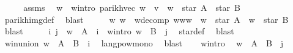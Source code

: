 \begin{isabellebody}
%
\isadelimproof
%
\endisadelimproof
%
\isatagproof
{}\isamarkupfalse%
\ {\isacharminus}{\kern0pt}\isanewline
\ \ \isamarkupfalse%
\ assms\ \isamarkupfalse%
\ w\ \ w{\isacharunderscore}{\kern0pt}intro{\isacharcolon}{\kern0pt}\ {\isachardoublequoteopen}parikh{\isacharunderscore}{\kern0pt}vec\ w\ {\isacharequal}{\kern0pt}\ v\ {\isasymand}\ w\ {\isasymin}\ star\ A\ {\isacharat}{\kern0pt}{\isacharat}{\kern0pt}\ star\ B{\isachardoublequoteclose}\isanewline
\ \ \ \ \isamarkupfalse%
\ parikh{\isacharunderscore}{\kern0pt}img{\isacharunderscore}{\kern0pt}def\ \isamarkupfalse%
\ blast\isanewline
\ \ \isamarkupfalse%
\ \isamarkupfalse%
\ w{}\ w{}\ \ w{\isacharunderscore}{\kern0pt}decomp{\isacharcolon}{\kern0pt}\ {\isachardoublequoteopen}w{\isacharequal}{\kern0pt}w{}{\isacharat}{\kern0pt}w{}\ {\isasymand}\ w{}\ {\isasymin}\ star\ A\ {\isasymand}\ w{}\ {\isasymin}\ star\ B{\isachardoublequoteclose}\ \isamarkupfalse%
\ blast\isanewline
\ \ \isamarkupfalse%
\ \isamarkupfalse%
\ i\ j\ \ {\isachardoublequoteopen}w{}\ {\isasymin}\ A\ {\isacharcircum}{\kern0pt}{\isacharcircum}{\kern0pt}\ i{\isachardoublequoteclose}\ \ w{}{\isacharunderscore}{\kern0pt}intro{\isacharcolon}{\kern0pt}\ {\isachardoublequoteopen}w{}\ {\isasymin}\ B\ {\isacharcircum}{\kern0pt}{\isacharcircum}{\kern0pt}\ j{\isachardoublequoteclose}\ \isamarkupfalse%
\ star{\isacharunderscore}{\kern0pt}def\ \isamarkupfalse%
\ blast\isanewline
\ \ \isamarkupfalse%
\ \isamarkupfalse%
\ w{}{\isacharunderscore}{\kern0pt}in{\isacharunderscore}{\kern0pt}union{\isacharcolon}{\kern0pt}\ {\isachardoublequoteopen}w{}\ {\isasymin}\ {\isacharparenleft}{\kern0pt}A\ {\isasymunion}\ B{\isacharparenright}{\kern0pt}\ {\isacharcircum}{\kern0pt}{\isacharcircum}{\kern0pt}\ i{\isachardoublequoteclose}\ \isamarkupfalse%
\ langpow{\isacharunderscore}{\kern0pt}mono\ \isamarkupfalse%
\ blast\isanewline
\ \ \isamarkupfalse%
\ w{}{\isacharunderscore}{\kern0pt}intro\ \isamarkupfalse%
\ {\isachardoublequoteopen}w{}\ {\isasymin}\ {\isacharparenleft}{\kern0pt}A\ {\isasymunion}\ B{\isacharparenright}{\kern0pt}\ {\isacharcircum}{\kern0pt}{\isacharcircum}{\kern0pt}\ j{\isachardoublequoteclose}\ \isamarkupfalse%

\end{isabellebody}
